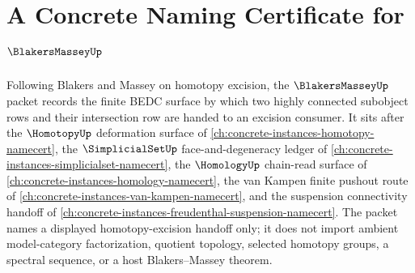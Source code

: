 \chapter{A Concrete Naming Certificate for $\BlakersMasseyUp$}
\label{ch:concrete-instances-blakers-massey-namecert}

Following Blakers and Massey on homotopy excision, the $\BlakersMasseyUp$ packet records the finite BEDC surface by which two highly connected subobject rows and their intersection row are handed to an excision consumer. It sits after the $\HomotopyUp$ deformation surface of \autoref{ch:concrete-instances-homotopy-namecert}, the $\SimplicialSetUp$ face-and-degeneracy ledger of \autoref{ch:concrete-instances-simplicialset-namecert}, the $\HomologyUp$ chain-read surface of \autoref{ch:concrete-instances-homology-namecert}, the van Kampen finite pushout route of \autoref{ch:concrete-instances-van-kampen-namecert}, and the suspension connectivity handoff of \autoref{ch:concrete-instances-freudenthal-suspension-namecert}. The packet names a displayed homotopy-excision handoff only; it does not import ambient model-category factorization, quotient topology, selected homotopy groups, a spectral sequence, or a host Blakers--Massey theorem.

